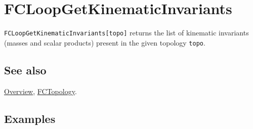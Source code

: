 \documentclass[../FeynCalcManual.tex]{subfiles}
\begin{document}
\hypertarget{fcloopgetkinematicinvariants}{
\section{FCLoopGetKinematicInvariants}\label{fcloopgetkinematicinvariants}}

\texttt{FCLoopGetKinematicInvariants[\allowbreak{}topo]} returns the
list of kinematic invariants (masses and scalar products) present in the
given topology \texttt{topo}.

\subsection{See also}

\hyperlink{toc}{Overview}, \hyperlink{fctopology}{FCTopology}.

\subsection{Examples}
\end{document}
